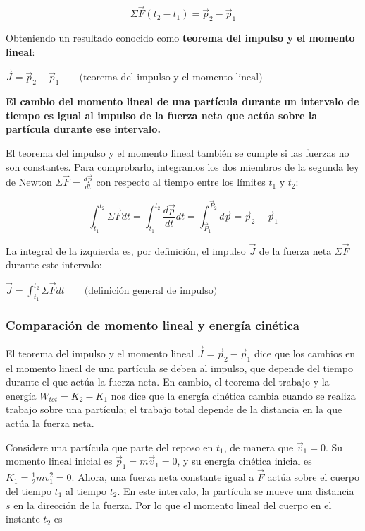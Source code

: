 \documentclass{article}
\newcommand{\newtitle}[1]{
    \color{titleColor}
    \subsubsection{\textbf{#1}}
    \color{black}
}
\newcommand{\bl}[1]{\textbf{#1}}
\newcommand{\definicion}[1]{%
    \vspace{0.5cm}
    \begin{definicionbox}
        #1
    \end{definicionbox}
    \vspace{0.5cm}
}
\begin{document}
    \[ \Sigma \vec{F} (t_2 - t_1) = \vec{p}_2 - \vec{p}_1 \]

    \par Obteniendo un resultado conocido como \bl{teorema del impulso y el momento lineal}:

    \definicion{
        \centering
        \( \vec{J} = \vec{p}_2 - \vec{p}_1 \quad \quad \text{(teorema del impulso y el momento lineal)} \)
    }

    \definicion{
        \bl{El cambio del momento lineal de una partícula durante un intervalo de tiempo es igual al impulso de la fuerza neta que actúa sobre la partícula durante ese intervalo.}
    }

    \par El teorema del impulso y el momento lineal también se cumple si las fuerzas no son constantes. Para comprobarlo, integramos los dos miembros de la segunda ley de Newton $\Sigma \vec{F} = \frac{d \vec{p}}{dt}$ con respecto al tiempo entre los límites $t_1$ y $t_2$:

    \[ \int_{t_1}^{t_2} \Sigma \vec{F} dt = \int_{t_1}^{t_2} \frac{d \vec{p}}{dt} dt = \int_{\vec{P}_1}^{\vec{P}_2} d \vec{p} = \vec{p}_2 - \vec{p}_1 \]

    \par La integral de la izquierda es, por deﬁnición, el impulso $\vec{J}$ de la fuerza neta $\Sigma \vec{F}$ durante este intervalo:

    \definicion{
        \centering
        \( \vec{J} = \int_{t_1}^{t_2} \Sigma \vec{F} dt \quad \quad \text{(deﬁnición general de impulso)} \)
    }

    \newtitle{Comparación de momento lineal y energía cinética}

    \par El teorema del impulso y el momento lineal $\vec{J} = \vec{p}_2 - \vec{p}_1$ dice que los cambios en el momento lineal de una partícula se deben al impulso, que depende del tiempo durante el que actúa la fuerza neta. En cambio, el teorema del trabajo y la energía $W_{tot} = K_2 - K_1$ nos dice que la energía cinética cambia cuando se realiza trabajo sobre una partícula; el trabajo total depende de la distancia en la que actúa la fuerza neta. 

    \par Considere una partícula que parte del reposo en $t_1$, de manera que $\vec{v}_1 = 0$. Su momento lineal inicial es $\vec{p}_1 = m \vec{v}_1 = 0$, y su energía cinética inicial es $K_1 = \frac{1}{2} m v_1^2 = 0$. Ahora, una fuerza neta constante igual a $\vec{F}$ actúa sobre el cuerpo del tiempo $t_1$ al tiempo $t_2$. En este intervalo, la partícula se mueve una distancia $s$ en la dirección de la fuerza. Por lo que el momento lineal del cuerpo en el instante $t_2$ es
\end{document}
